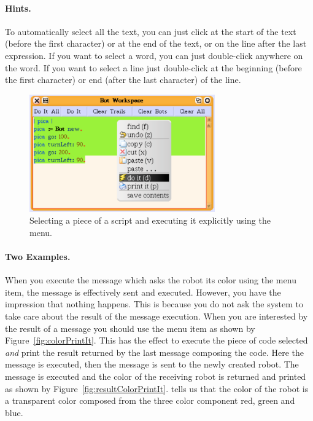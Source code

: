 \paragraph{Hints.} To automatically select all the text, you can just click at the start of the text (before the first character) or at the end of the text, or on the line after the last expression.  If you want to select a word, you can just double-click anywhere on the word.  If you want to select a line just double-click at the beginning (before the first character) or end (after the last character) of the line.

 
\begin{figure}[h]
\begin{center}
\includegraphics[width=8cm]{doitViaMenu}
\caption{Selecting a piece of a script and executing it explicitly using the menu.\label{fig:doitMenu}}
\end{center}
\end{figure}


\paragraph{Two Examples.}
When you execute the message  which asks the robot its color using the  menu item, the message is effectively sent and executed. However, you have the impression that nothing happens. This is because you do not ask the system to take care about the result of the message execution. When you are interested by the result of a message you should use the menu item  as shown by Figure~\ref{fig:colorPrintIt}. This has the effect to execute the piece of code selected \emph{and} print the result returned by the last message composing the code.
Here the message  is executed, then the message  is sent to the newly created robot. The message  is executed and the color of the receiving robot is returned and printed as shown by Figure~\ref{fig:resultColorPrintIt}.
  tells us that the color of the robot is a transparent color composed from the three color component red, green and blue.






